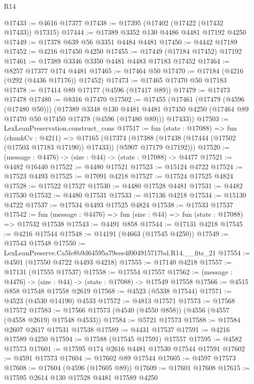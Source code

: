 \begin{lexlean}{R14}
\begin{coremodule}
@17433 := @4616 @17377
@17438 := @17395 (@17402 (@17422 (@17432 @17433)) @17315)
@17444 := @17389 @3352 @130 @4486 @4481 @17192 @4250
@17449 := @17378 @639 @56 @3351 @4484 @4481
@17450 := @4442 @17189
@17452 := @4216 @17450 @4250
@17455 := @17449 (@17184 @17452) @17192
@17461 := @17389 @3346 @3350 @4481 @4483 @17183 @17452
@17464 := @8257 @17377 @174 @4481
@17465 := @17464 @50
@17470 := @17184 (@4216 (@292 (@4436 @17176)) @17452)
@17473 := @17465 @17470 @50 @17183
@17478 := @17414 @89 @17177 (@4596 (@17417 @89))
@17479 := @17473 @17478
@17480 := @8316 @17470
@17502 := @17455
    (@17461
      (@17479 (@4596 (@17480 @50)))
      (@17389
        @3348
        @130
        @4481
        @4481
        @17450
        @4250
        (@17464 @89 @17470 @50 @17450 @17478 (@4596 (@17480 @89)))
        @17433))
@17503 := LexLeanPreservation.construct_cons
@17517 := fun (state : @17088) =>
  fun (chunkCv : @4211) =>
  @17165
    (@17374 (@17388 (@17438 (@17444 (@17502 (@17503 @17183 @17190)) @17433)) (@5907 @17179 @17192)))
@17520 := (message : @4476) -> (size : @44) -> (state : @17088) -> @4477
@17521 := @4482 @16440
@17522 := @4480 @17521
@17523 := @15124 @4722
@17524 := @17523 @4493
@17525 := @17091 @4218
@17527 := @17524 @17525 @4824
@17528 := @17522 @17527
@17530 := @4480 @17528 @4481
@17531 := @4482 @17530
@17532 := @4480 @17531
@17533 := @17136 @4218
@17534 := @15130 @4722
@17537 := @17534 @4493 @17525 @4824
@17538 := @17533 @17537
@17542 := fun (message : @4476) => fun (size : @44) => fun (state : @17088) => @17532 @17538
@17543 := @4491 @858
@17544 := @17131 @4218
@17545 := @4216 @17544
@17548 := @14191 (@4663 (@17545 @4250))
@17549 := @17543 @17548
@17550 := LexLeanPreserve.Ca5fe8b9d64595a79eee4f004915717bd.R14.__fits_21
@17554 := @4501 (@17550 @4722 @4493 @4218)
@17555 := @17140 @4218
@17557 := @17131 (@17555 @17537)
@17558 := @17554 @17557
@17562 := (message : @4476) -> (size : @44) -> (state : @17088) -> @17549 @17558
@17566 := @4515 @858 @17548 @17558 @2619
@17568 := @4523 (@5338 @17544)
@17571 := @4523 (@4530 @14190) @4533
@17572 := @4813 @17571
@17573 := @17568 @17572
@17583 := @17566 @17573 (@4540 (@4550 @858)) (@4556 (@4557 (@4558 @2619) @17548 @4533))
@17584 := @5721 @17573
@17588 := @17584 @2607 @2617 @17531 @17538
@17589 := @4431 @17537
@17591 := @4216 @17589 @4250
@17594 := @17588 (@17545 @17591) @17557
@17595 := @4582 @17573
@17601 := @17595 @174 @2616 @4481 @17530 @17544 @17591
@17602 := @4591 @17573
@17604 := @17602 @89 @17544
@17605 := @4597 @17573
@17608 := @17604 (@4596 (@17605 @89))
@17609 := @17601 @17608
@17615 := @17595 @2614 @130 @17528 @4481 @17589 @4250

\end{coremodule}
\end{lexlean}
